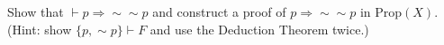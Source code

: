 Show that $\vdash p \Rightarrow \sim\sim p$ and construct a proof of $p \Rightarrow \sim\sim p$ in $\text{Prop}(X)$. (Hint: show $\{p, \sim p\} \vdash F$ and use the Deduction Theorem twice.)
